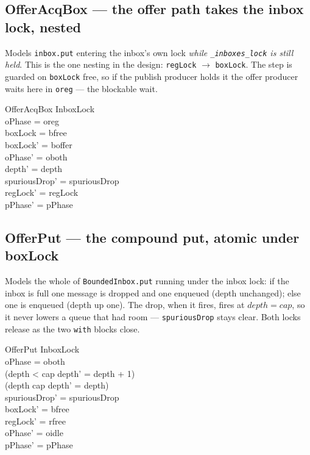 \documentclass[a4paper,10pt,fleqn]{article}
\begin{document}
\subsection{OfferAcqBox --- the offer path takes the inbox lock, nested}

Models \texttt{inbox.put} entering the inbox's own lock \emph{while
\texttt{\_inboxes\_lock} is still held}. This is the one nesting in the design:
\texttt{regLock} $\to$ \texttt{boxLock}. The step is guarded on
\texttt{boxLock} free, so if the publish producer holds it the offer producer
waits here in \texttt{oreg} --- the blockable wait.

\begin{schema}{OfferAcqBox}
  \Delta InboxLock \\
\where
  oPhase = oreg \\
  boxLock = bfree \\
  boxLock' = boffer \\
  oPhase' = oboth \\
  depth' = depth \\
  spuriousDrop' = spuriousDrop \\
  regLock' = regLock \\
  pPhase' = pPhase
\end{schema}

\subsection{OfferPut --- the compound put, atomic under boxLock}

Models the whole of \texttt{BoundedInbox.put} running under the inbox lock: if
the inbox is full one message is dropped and one enqueued (depth unchanged); else
one is enqueued (depth up one). The drop, when it fires, fires at $depth = cap$,
so it never lowers a queue that had room --- \texttt{spuriousDrop} stays clear.
Both locks release as the two \texttt{with} blocks close.

\begin{schema}{OfferPut}
  \Delta InboxLock \\
\where
  oPhase = oboth \\
  (depth < cap \implies depth' = depth + 1) \\
  (depth \geq cap \implies depth' = depth) \\
  spuriousDrop' = spuriousDrop \\
  boxLock' = bfree \\
  regLock' = rfree \\
  oPhase' = oidle \\
  pPhase' = pPhase
\end{schema}
\end{document}
